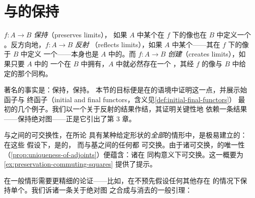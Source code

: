 \providecommand{\Fun}{\operatorname{Fun}}
\providecommand{\Cat}{\mathcal{C}at}
\providecommand{\QCat}{\mathcal{Q}\mathcal{C}at}
\providecommand{\sSet}{s\mathcal{S}et}
\providecommand{\qcOne}{\mathbf{1}}   %
\providecommand{\colim}{\operatorname{colim}\nolimits}

\section{\trLimit{}与\trColimit{}的保持}\label{sec:preservation-of-limits-and-colimits}

\trFunctor $f\colon A\to B$ \emph{保持\trLimit}（preserves limits），
如果 $A$ 中某个\trLimit\trCone{}在 $f$ 下的像也在 $B$ 中定义一个%
\trLimit\trCone。反方向地，\trFunctor $f\colon A\to B$ \emph{反射\trLimit}%
（reflects limits），如果 $A$ 中某个\trCone——其在 $f$ 下的像于 $B$ 中定义
一个\trLimit\trCone——本身也是 $A$ 中的\trLimit\trCone。而\trFunctor
$f\colon A\to B$ \emph{创建\trLimit}（creates limits），如果只要 $A$ 中的
一个\trDiagram{}在 $B$ 中拥有\trLimit\trCone，$A$ 中就必然存在一个%
\trLimit\trCone，其经 $f$ 的像与 $B$ 中给定的那个\trLimit\trCone{}同构。

著名的事实是：\trRightAdjoint{}保持\trLimit，\trLeftAdjoint{}保持\trColimit。
本节的目标便是在\trInfinityCategory{}的语境中证明这一点，并展示始函子与
终函子（initial and final functors，含义见\cref{def:initial-final-functors}）
最初的几个例子。我们以一个关于\trLimit{}反射的结果作结，其证明关键性地
依赖一条结果——\trCosmologicalFunctor{}保持绝对\trLifting{}图——正是它引出了第 3 章。

\trRightAdjoint{}与\trLimit{}之间的可交换性，在所论\trInfinityCategory{}%
具有某种给定形状的\emph{全部}\trLimit{}的情形中，是极易建立的：在这些
假设下，\trLimit\trFunctor{}是\trConstantFunctor{}的\trRightAdjoint，
而\trConstantFunctor{}与基\trInfinityCategory{}之间的任何\trFunctor{}都
可交换。由于诸\trLeftAdjoint{}可交换，\trAdjunction{}的唯一性
（\cref{prop:uniqueness-of-adjoints}）便蕴含：诸\trRightAdjoint{}在
同构意义下可交换。这一概要为\cref{ex:preservation-commuting-squares}
提供了提示。

在一般情形需要更精细的论证——比如，在不预先假设任何其他\trLimit{}存在
的情况下保持单个\trLimit\trDiagram。我们诉诸一条关于绝对\trLifting{}图
之合成与消去的一般引理：


